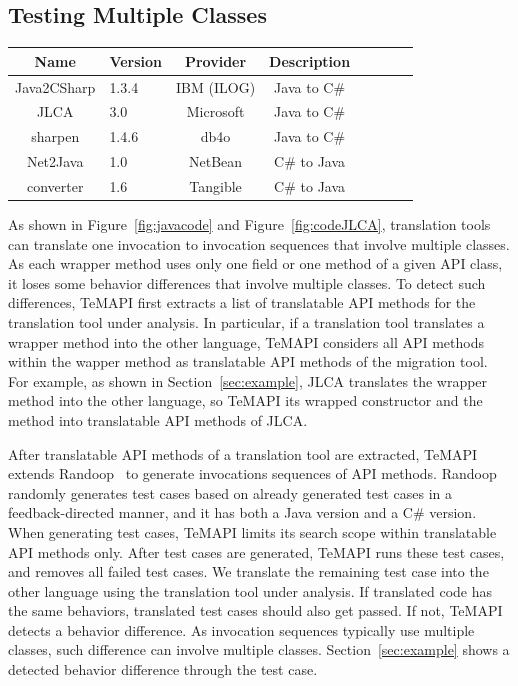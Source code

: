 \subsection{Testing Multiple Classes}
\label{sec:approach:sequence}
\begin{table}[t]
\centering
\begin{SmallOut}
\begin {tabular} {|c|l|c|c|c|c|c|c|}
 \hline
\textbf{Name}& \textbf{Version}& \textbf{Provider} &\textbf{Description}\\
\hline
Java2CSharp  &  1.3.4 & IBM (ILOG) & Java to C\# \\
\hline
JLCA         &  3.0   & Microsoft  & Java to C\# \\
\hline
sharpen      &  1.4.6 & db4o       & Java to C\# \\
\hline
Net2Java     &  1.0   & NetBean    &  C\# to Java\\
\hline
converter    &  1.6   & Tangible   &  C\# to Java\\
\hline
\end{tabular}\vspace*{-2ex}
 \label{table:subjects}
\end{SmallOut}\vspace*{-4ex}
\end{table}
As shown in Figure~\ref{fig:javacode} and Figure~\ref{fig:codeJLCA}, translation tools can translate one invocation to invocation sequences that involve multiple classes. As each wrapper method uses only one field or one method of a given API class, it loses some behavior differences that involve multiple classes. To detect such differences, TeMAPI first extracts a list of translatable API methods for the translation tool under analysis. In particular, if a translation tool translates a wrapper method into the other language, TeMAPI considers all API methods within the wapper method as translatable API methods of the migration tool. For example, as shown in Section~\ref{sec:example}, JLCA translates the  wrapper method into the other language, so TeMAPI its wrapped  constructor and the  method into translatable API methods of JLCA.

After translatable API methods of a translation tool are extracted, TeMAPI extends Randoop~\cite{pacheco2007feedback} to generate invocations sequences of API methods. Randoop randomly generates test cases based on already generated test cases in a feedback-directed manner, and it has both a Java version and a C\# version. When generating test cases, TeMAPI limits its search scope within translatable API methods only. After test cases are generated, TeMAPI runs these test cases, and removes all failed test cases. We translate the remaining test case into the other language using the translation tool under analysis. If translated code has the same behaviors, translated test cases should also get passed. If not, TeMAPI detects a behavior difference. As invocation sequences typically use multiple classes, such difference can involve multiple classes. Section~\ref{sec:example} shows a detected behavior difference through the  test case.


